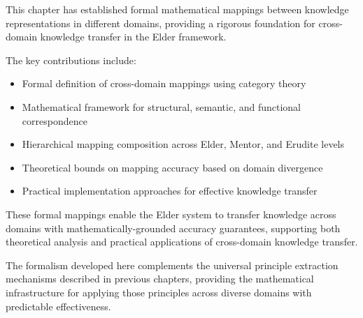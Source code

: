 This chapter has established formal mathematical mappings between knowledge representations in different domains, providing a rigorous foundation for cross-domain knowledge transfer in the Elder framework.

The key contributions include:
\begin{itemize}
    \item Formal definition of cross-domain mappings using category theory
    \item Mathematical framework for structural, semantic, and functional correspondence
    \item Hierarchical mapping composition across Elder, Mentor, and Erudite levels
    \item Theoretical bounds on mapping accuracy based on domain divergence
    \item Practical implementation approaches for effective knowledge transfer
\end{itemize}

These formal mappings enable the Elder system to transfer knowledge across domains with mathematically-grounded accuracy guarantees, supporting both theoretical analysis and practical applications of cross-domain knowledge transfer.

The formalism developed here complements the universal principle extraction mechanisms described in previous chapters, providing the mathematical infrastructure for applying those principles across diverse domains with predictable effectiveness.